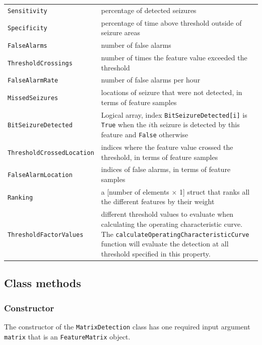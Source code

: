 \documentclass[usletter, 11pt]{extarticle}
\begin{document}
\begin{center}
\begin{longtable}{p{5cm}|p{12cm}}
    
    \texttt{Sensitivity} & percentage of detected seizures \\
    \texttt{Specificity} & percentage of time above threshold outside of seizure areas \\
    \texttt{FalseAlarms} & number of false alarms \\
    \texttt{ThresholdCrossings} & number of times the feature value exceeded the threshold \\
    \texttt{FalseAlarmRate} & number of false alarms per hour \\
    \texttt{MissedSeizures} & locations of seizure that were not detected, in terms of feature samples \\
    \texttt{BitSeizureDetected} & Logical array, index \verb|BitSeizureDetected[i]| is \verb|True| when the $i$th seizure is detected by this feature and \verb|False| otherwise \\
    \texttt{ThresholdCrossedLocation} & indices where the feature value crossed the threshold, in terms of feature samples \\
    \texttt{FalseAlarmLocation} & indices of false alarms, in terms of feature samples \\
    \texttt{Ranking} & a [number of elements $\times$ 1] struct that ranks all the different features by their weight \\
    \texttt{ThresholdFactorValues} & different threshold values to evaluate when calculating the operating characteristic curve. The \verb|calculateOperatingCharacteristicCurve| function will evaluate the detection at all threshold specified in this property.
	\end{longtable}
\end{center}

\subsection{Class methods}

\subsubsection{Constructor}

The constructor of the \verb|MatrixDetection| class has one required input argument \verb|matrix| that is an \verb|FeatureMatrix| object. 
\end{document}
